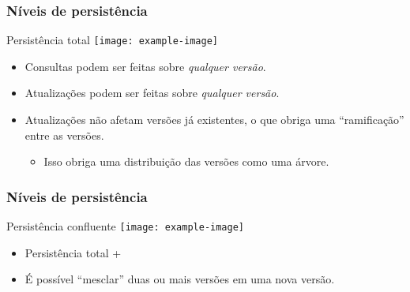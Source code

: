     \begin{frame}
        \frametitle{Níveis de persistência}

        \begin{block}{Persistência total}
            \centering
            \texttt{[image: example-image]}
        \end{block}

        \begin{itemize}
            \item<1-> Consultas podem ser feitas sobre {\em qualquer versão}.
            \item<2-> Atualizações podem ser feitas sobre {\em qualquer versão}.
            \item<3-> Atualizações não afetam versões já existentes, o que obriga uma ``ramificação'' entre as versões.
            \begin{itemize}
                \item<4-> Isso obriga uma distribuição das versões como uma árvore.
            \end{itemize}
        \end{itemize}

    \end{frame}

    \begin{frame}
        \frametitle{Níveis de persistência}

        \begin{block}{Persistência confluente}
            \centering
            \texttt{[image: example-image]}
        \end{block}

        \begin{itemize}
            \item Persistência total +
            \item<2-> É possível ``mesclar'' duas ou mais versões em uma nova versão.
        \end{itemize}

    \end{frame}

